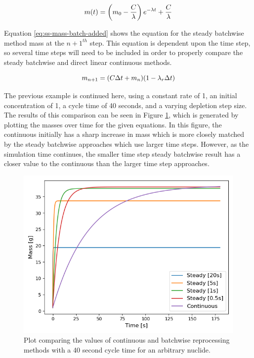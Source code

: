 \begin{equation} \hfill 
m(t) = \left(m_0 - \frac{C}{\lambda} \right) e^{-\lambda t} + \frac{C}{\lambda}
\hfill\label{eq:ss-mass-p7} \end{equation}

Equation \eqref{eq:ss-mass-batch-added} shows the equation for the steady batchwise method mass at the $n+1^{th}$ step. This equation is dependent upon the time step, so several time steps will need to be included in order to properly compare the steady batchwise and direct linear continuous methods.

\begin{equation} \hfill 
m_{n+1} = (C \Delta t + m_n) (1 - \lambda_r \Delta t)
\hfill\label{eq:ss-mass-batch-added} \end{equation}

The previous example is continued here, using a constant rate of 1, an initial concentration of 1, a cycle time of 40 seconds, and a varying depletion step size. The results of this comparison can be seen in Figure \ref{fig:steady_cont_repr_diff}, which is generated by plotting the masses over time for the given equations. In this figure, the continuous initially has a sharp increase in mass which is more closely matched by the steady batchwise approaches which use larger time steps. However, as the simulation time continues, the smaller time step steady batchwise result has a closer value to the continuous than the larger time step approaches.

\begin{figure}[H]
  \centering
  \includegraphics[scale=0.7]{images/dirlin-steady-comp.png}
  \caption{Plot comparing the values of continuous and batchwise reprocessing methods with a 40 second cycle time for an arbitrary nuclide.}
   \label{fig:steady_cont_repr_diff}
\end{figure}

